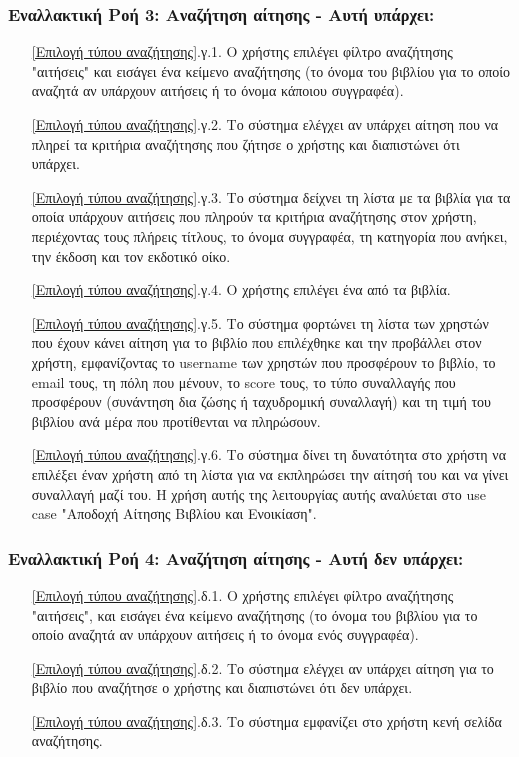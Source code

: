 \documentclass[12pt,a4paper]{article}
\begin{document}
\subsubsection*{Εναλλακτική Ροή 3: Αναζήτηση αίτησης - Αυτή υπάρχει:}
\begin{enumerate}
    \item[\ref{Επιλογή τύπου αναζήτησης}.γ.1.] Ο χρήστης επιλέγει φίλτρο αναζήτησης "αιτήσεις" και εισάγει ένα κείμενο αναζήτησης (το όνομα του βιβλίου για το οποίο αναζητά αν υπάρχουν αιτήσεις ή το όνομα κάποιου συγγραφέα).
    \item[\ref{Επιλογή τύπου αναζήτησης}.γ.2.] Το σύστημα ελέγχει αν υπάρχει αίτηση που να πληρεί τα κριτήρια αναζήτησης που ζήτησε ο χρήστης και διαπιστώνει ότι υπάρχει.
    \item[\ref{Επιλογή τύπου αναζήτησης}.γ.3.] Το σύστημα δείχνει τη λίστα με τα βιβλία για τα οποία υπάρχουν αιτήσεις που πληρούν τα κριτήρια αναζήτησης στον χρήστη, περιέχοντας τους πλήρεις τίτλους, το όνομα συγγραφέα, τη κατηγορία που ανήκει, την έκδοση και τον εκδοτικό οίκο.
    \item[\ref{Επιλογή τύπου αναζήτησης}.γ.4.] Ο χρήστης επιλέγει ένα από τα βιβλία.
    \item[\ref{Επιλογή τύπου αναζήτησης}.γ.5.] Το σύστημα φορτώνει τη λίστα των χρηστών που έχουν κάνει αίτηση για το βιβλίο που επιλέχθηκε και την προβάλλει στον χρήστη, εμφανίζοντας το username των χρηστών που προσφέρουν το βιβλίο, το email τους, τη πόλη που μένουν, το score τους, το τύπο συναλλαγής που προσφέρουν (συνάντηση δια ζώσης ή ταχυδρομική συναλλαγή) και τη τιμή του βιβλίου ανά μέρα που προτίθενται να πληρώσουν.
    \item[\ref{Επιλογή τύπου αναζήτησης}.γ.6.] Το σύστημα δίνει τη δυνατότητα στο χρήστη να επιλέξει έναν χρήστη από τη λίστα για να εκπληρώσει την αίτησή του και να γίνει συναλλαγή μαζί του. Η χρήση αυτής της λειτουργίας αυτής αναλύεται στο use case "Αποδοχή Αίτησης Βιβλίου και Ενοικίαση".
\end{enumerate}

\subsubsection*{Εναλλακτική Ροή 4: Αναζήτηση αίτησης - Αυτή δεν υπάρχει:}
\begin{enumerate}
    \item[\ref{Επιλογή τύπου αναζήτησης}.δ.1.] Ο χρήστης επιλέγει φίλτρο αναζήτησης "αιτήσεις", και εισάγει ένα κείμενο αναζήτησης (το όνομα του βιβλίου για το οποίο αναζητά αν υπάρχουν αιτήσεις ή το όνομα ενός συγγραφέα).
    \item[\ref{Επιλογή τύπου αναζήτησης}.δ.2.] Το σύστημα ελέγχει αν υπάρχει αίτηση για το βιβλίο που αναζήτησε ο χρήστης και διαπιστώνει ότι δεν υπάρχει.
    \item[\ref{Επιλογή τύπου αναζήτησης}.δ.3.] Το σύστημα εμφανίζει στο χρήστη κενή σελίδα αναζήτησης.
\end{enumerate}
\end{document}
